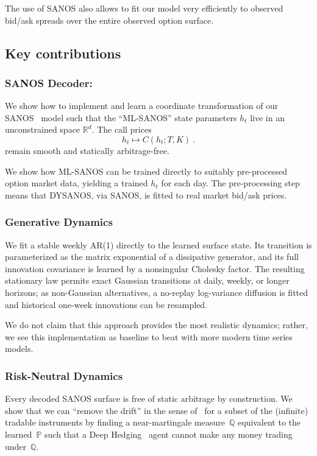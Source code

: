 \documentclass[11pt,a4paper]{article}
\newcommand{\R}{\mathbb{R}}
\newcommand{\Q}{\mathbb{Q}}
\renewcommand{\P}{\mathbb{P}}
\renewcommand{\Q}{\mathbb{Q}}
\begin{document}
The use of SANOS also allows to fit our model very efficiently to observed bid/ask spreads over the entire observed option surface.

\subsection*{Key contributions}


\subsubsection*{SANOS Decoder:}
    We show how to implement and learn a coordinate transformation of
    our SANOS~\cite{SANOS2026} model 
    such that the ``ML-SANOS'' state parameters $h_t$ live in an unconstrained space 
    $\R^{d}$.  The call
    prices 
    $$
        h_t \longmapsto C(h_t;T,K)  \ .
    $$    
    remain smooth and statically arbitrage-free.
    
    We show how ML-SANOS can be trained directly to suitably pre-processed 
    option market data, yielding a trained $h_t$ for each day.
    The pre-processing step means that DYSANOS, via SANOS, is fitted to real market bid/ask prices.
    
\subsubsection*{Generative Dynamics}
    We fit a stable weekly AR(1) directly to the learned
    surface state. Its transition is parameterized as the matrix exponential
    of a dissipative generator, and its full innovation covariance is learned
    by a nonsingular Cholesky factor. The resulting stationary law permits
    exact Gaussian transitions at daily, weekly, or longer horizons; as
    non-Gaussian alternatives, a no-replay log-variance diffusion is fitted
    and historical one-week innovations can be resampled.
    
    We do not
    claim that this approach provides the most realistic dynamics; rather,
    we see this implementation as baseline to beat with more modern
    time series models.

\subsubsection*{Risk-Neutral Dynamics}

Every decoded SANOS surface is free of static arbitrage by construction.
We show that we can ``remove the drift'' in the sense of~\cite{removedrift} for a subset of the (infinite) tradable instruments
by finding a near-martingale measure~$\Q$ equivalent to the learned~$\P$ such that a
Deep Hedging~\cite{DH} agent cannot make any money trading under~$\Q$.
\end{document}
